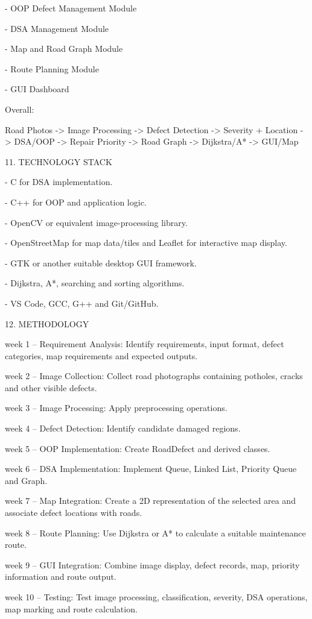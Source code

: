 \documentclass[
]{article}
\begin{document}
- OOP Defect Management Module

- DSA Management Module

- Map and Road Graph Module

- Route Planning Module

- GUI Dashboard

Overall:

Road Photos -\textgreater{} Image Processing -\textgreater{} Defect
Detection -\textgreater{} Severity + Location -\textgreater{} DSA/OOP
-\textgreater{} Repair Priority -\textgreater{} Road Graph
-\textgreater{} Dijkstra/A* -\textgreater{} GUI/Map

11. TECHNOLOGY STACK

- C for DSA implementation.

- C++ for OOP and application logic.

- OpenCV or equivalent image-processing library.

- OpenStreetMap for map data/tiles and Leaflet for interactive map
display.

- GTK or another suitable desktop GUI framework.

- Dijkstra, A*, searching and sorting algorithms.

- VS Code, GCC, G++ and Git/GitHub.

12. METHODOLOGY

week 1 -- Requirement Analysis: Identify requirements, input format,
defect categories, map requirements and expected outputs.

week 2 -- Image Collection: Collect road photographs containing
potholes, cracks and other visible defects.

week 3 -- Image Processing: Apply preprocessing operations.

week 4 -- Defect Detection: Identify candidate damaged regions.

week 5 -- OOP Implementation: Create RoadDefect and derived classes.

week 6 -- DSA Implementation: Implement Queue, Linked List, Priority
Queue and Graph.

week 7 -- Map Integration: Create a 2D representation of the selected
area and associate defect locations with roads.

week 8 -- Route Planning: Use Dijkstra or A* to calculate a suitable
maintenance route.

week 9 -- GUI Integration: Combine image display, defect records, map,
priority information and route output.

week 10 -- Testing: Test image processing, classification, severity, DSA
operations, map marking and route calculation.
\end{document}
